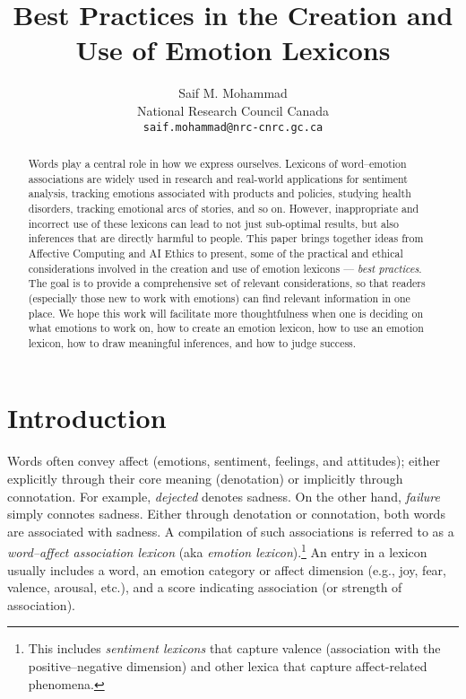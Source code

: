 \documentclass[11pt]{article}
\title{Best Practices in the Creation and Use of Emotion Lexicons}
\author{Saif M. Mohammad\\
	    National Research Council Canada\\
	     {\tt saif.mohammad@nrc-cnrc.gc.ca} }
\begin{document}
\maketitle
\begin{abstract}
Words play a central role in how we express ourselves. Lexicons of word--emotion associations are widely used in research and real-world applications for sentiment analysis, tracking emotions associated with products and policies, studying health disorders, tracking emotional arcs of stories, and so on. However, inappropriate and incorrect use of these lexicons can lead to not just sub-optimal results, but also inferences that are directly harmful to people. This paper brings together ideas from Affective Computing and AI Ethics to present, some of the practical and ethical  considerations involved in the creation and use of emotion lexicons ---  \textit{best practices}. The goal is to provide a comprehensive set of relevant considerations, so that readers (especially those new to work with emotions) can find relevant information in one place.
We hope this work will facilitate more thoughtfulness when one is deciding on what emotions to work on, how to create an emotion lexicon, 
how to use an emotion lexicon, how to draw meaningful inferences, and how to judge success. 
\end{abstract}


\section{Introduction}
\label{sec:intro}


\noindent Words often convey affect (emotions, sentiment, feelings, and attitudes); either explicitly through their core meaning (denotation) or implicitly through connotation. 
For example, \textit{dejected} denotes sadness. %
On the other hand, \textit{failure} simply connotes sadness. %
Either through denotation or connotation, both words are associated with sadness. 
A compilation of such associations is referred to as a {\it word--affect association lexicon} (aka \textit{emotion lexicon}).\footnote{This includes
\textit{sentiment lexicons} that capture valence (association with the positive--negative dimension) and other lexica that capture affect-related
phenomena.}
An entry in a lexicon usually includes a word, an emotion category or affect dimension (e.g., joy, fear, valence, arousal, etc.), and a score indicating association (or strength of association). 
\end{document}
